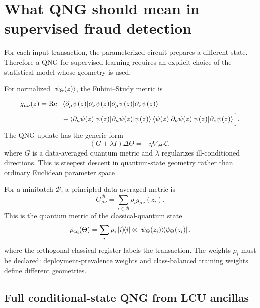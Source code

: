 \documentclass[11pt,a4paper]{article}
\newcommand{\B}{\mathcal{B}}
\begin{document}
\section{What QNG should mean in supervised fraud detection}

For each input transaction, the parameterized circuit prepares a different state. Therefore a QNG for supervised learning requires an explicit choice of the statistical model whose geometry is used.

For normalized $\ket{\psi_\Theta(z)}$, the Fubini--Study metric is
\begin{align}
 g_{\mu\nu}(z)
 =\operatorname{Re}\Big[&
 \braket{\partial_\mu\psi(z)|\partial_\nu\psi(z)} \\
 &-
 \braket{\partial_\mu\psi(z)|\psi(z)}
 \braket{\psi(z)|\partial_\nu\psi(z)}
 \Big].
\end{align}
The QNG update has the generic form
\begin{equation}
    (G+\lambda I)\Delta\Theta
    =-\eta\nabla_\Theta\mathcal L,
\end{equation}
where $G$ is a data-averaged quantum metric and $\lambda$ regularizes ill-conditioned directions. This is steepest descent in quantum-state geometry rather than ordinary Euclidean parameter space \cite{Stokes2020}.

For a minibatch $\B$, a principled data-averaged metric is
\begin{equation}
G_{\mu\nu}^{\B}
=\sum_{i\in\B}\rho_i g_{\mu\nu}(z_i).
\end{equation}
This is the quantum metric of the classical-quantum state
\begin{equation}
\rho_{\mathrm{cq}}(\Theta)
=\sum_i\rho_i
\ketbra{i}{i}\otimes
\ketbra{\psi_\Theta(z_i)}{\psi_\Theta(z_i)},
\end{equation}
where the orthogonal classical register labels the transaction. The weights $\rho_i$ must be declared: deployment-prevalence weights and class-balanced training weights define different geometries.

\subsection{Full conditional-state QNG from LCU ancillas}
\end{document}
